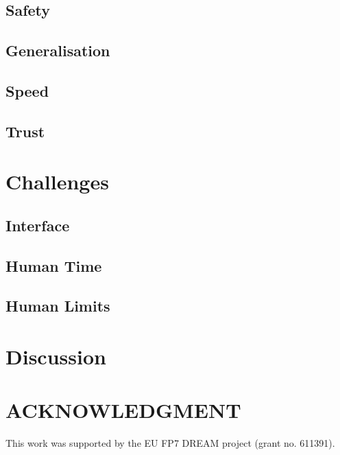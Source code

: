 \documentclass[letterpaper, 10 pt, conference]{ieeeconf}  %
\begin{document}
\subsection{Safety}

\subsection{Generalisation}

\subsection{Speed}

\subsection{Trust}

\section{Challenges}

\subsection{Interface}

\subsection{Human Time}

\subsection{Human Limits}

\section{Discussion}

\section*{ACKNOWLEDGMENT}

This work was supported by the EU FP7 DREAM project (grant no.  611391).






\end{document}
